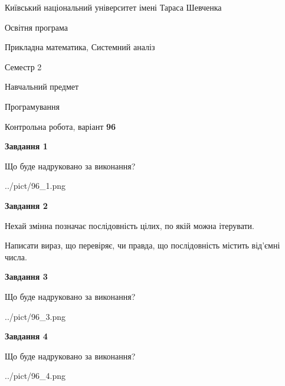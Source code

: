 \documentclass[12pt, ukrainian]{article}
\begin{document}
{{\begin {small}\par
{ \center  Київський національний університет імені Тараса Шевченка \par}
{\parbox {5 cm}{Освітня програма \hfill}{\parbox {8 cm}{Прикладна математика, Системний аналіз \hfill}}\parbox {5 cm}{\hfill Семестр 2}}\par
{\parbox {5 cm} {Навчальний предмет \hfill}\parbox {7 cm}{Програмування \hfill}\parbox {6cm}{\hfill}\par}\vspace{-7pt} \end{small}}{\center Контрольна робота, варіант  \No \textbf
{ 96 }\par}}
{
\begin {large}
{\begin {center}\textbf{Завдання 1}\end {center}}\par
Що буде надруковано за виконання?\par\par
\begin{center}
	{../pict/96_1.png}
\end{center}
\newpage

{\begin {center}\textbf{Завдання 2}\end {center}}\par
Нехай змінна  позначає послідовність цілих, по якій можна ітерувати.

Написати вираз, що перевіряє, чи правда, що послідовність  містить від’ємні числа.\par
\newpage

{\begin {center}\textbf{Завдання 3}\end {center}}\par
Що буде надруковано за виконання?
\begin{center}
	{../pict/96_3.png}
\end{center}
\newpage

{\begin {center}\textbf{Завдання 4}\end {center}}\par
Що буде надруковано за виконання?\par
\begin{center}
	{../pict/96_4.png}
\end{center}
\newpage


\end{large}}
\end{document}
